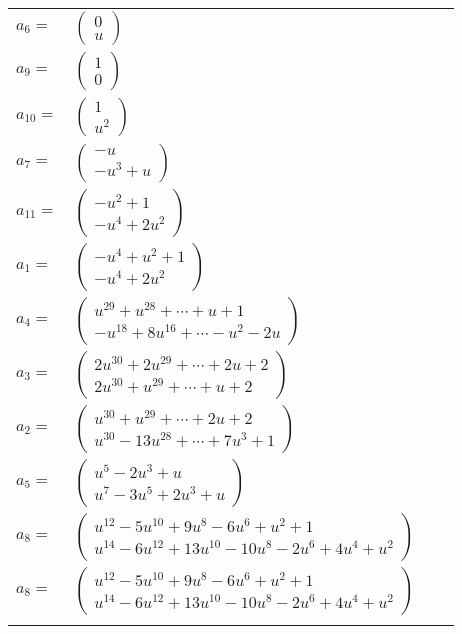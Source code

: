 \documentclass[1p]{elsarticle_modified}
\theoremstyle{definition}
\begin{document}
\begin{tabular}{m{7pt} m{180pt} m{7pt} m{180pt} }
\flushright $a_{6}=$&$\begin{pmatrix}0\\u\end{pmatrix}$ \\
\flushright $a_{9}=$&$\begin{pmatrix}1\\0\end{pmatrix}$ \\
\flushright $a_{10}=$&$\begin{pmatrix}1\\u^2\end{pmatrix}$ \\
\flushright $a_{7}=$&$\begin{pmatrix}- u\\- u^3+u\end{pmatrix}$ \\
\flushright $a_{11}=$&$\begin{pmatrix}- u^2+1\\- u^4+2 u^2\end{pmatrix}$ \\
\flushright $a_{1}=$&$\begin{pmatrix}- u^4+u^2+1\\- u^4+2 u^2\end{pmatrix}$ \\
\flushright $a_{4}=$&$\begin{pmatrix}u^{29}+u^{28}+\cdots+u+1\\- u^{18}+8 u^{16}+\cdots- u^2-2 u\end{pmatrix}$ \\
\flushright $a_{3}=$&$\begin{pmatrix}2 u^{30}+2 u^{29}+\cdots+2 u+2\\2 u^{30}+u^{29}+\cdots+u+2\end{pmatrix}$ \\
\flushright $a_{2}=$&$\begin{pmatrix}u^{30}+u^{29}+\cdots+2 u+2\\u^{30}-13 u^{28}+\cdots+7 u^3+1\end{pmatrix}$ \\
\flushright $a_{5}=$&$\begin{pmatrix}u^5-2 u^3+u\\u^7-3 u^5+2 u^3+u\end{pmatrix}$ \\
\flushright $a_{8}=$&$\begin{pmatrix}u^{12}-5 u^{10}+9 u^8-6 u^6+u^2+1\\u^{14}-6 u^{12}+13 u^{10}-10 u^8-2 u^6+4 u^4+u^2\end{pmatrix}$\\ \flushright $a_{8}=$&$\begin{pmatrix}u^{12}-5 u^{10}+9 u^8-6 u^6+u^2+1\\u^{14}-6 u^{12}+13 u^{10}-10 u^8-2 u^6+4 u^4+u^2\end{pmatrix}$\\&\end{tabular}
\end{document}
